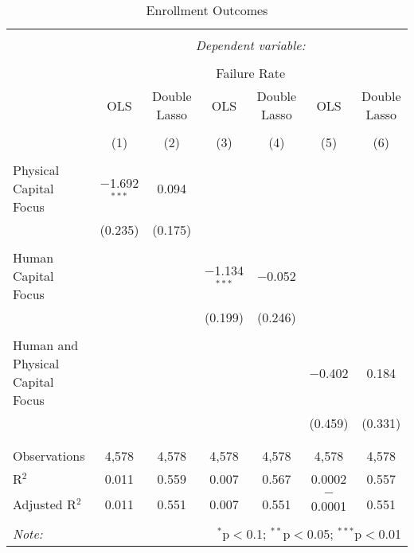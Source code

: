 
\begin{table}[!htbp] \centering 
  \caption{Enrollment Outcomes} 
  \label{} 
\begin{tabular}{@{\extracolsep{5pt}}lcccccc} 
\\[-1.8ex]\hline 
\hline \\[-1.8ex] 
 & \multicolumn{6}{c}{\textit{Dependent variable:}} \\ 
\cline{2-7} 
\\[-1.8ex] & \multicolumn{6}{c}{Failure Rate} \\ 
 & OLS & Double Lasso & OLS & Double Lasso & OLS & Double Lasso \\ 
\\[-1.8ex] & (1) & (2) & (3) & (4) & (5) & (6)\\ 
\hline \\[-1.8ex] 
 Physical Capital Focus & $-$1.692$^{***}$ & 0.094 &  &  &  &  \\ 
  & (0.235) & (0.175) &  &  &  &  \\ 
  & & & & & & \\ 
 Human Capital Focus &  &  & $-$1.134$^{***}$ & $-$0.052 &  &  \\ 
  &  &  & (0.199) & (0.246) &  &  \\ 
  & & & & & & \\ 
 Human and Physical Capital Focus &  &  &  &  & $-$0.402 & 0.184 \\ 
  &  &  &  &  & (0.459) & (0.331) \\ 
  & & & & & & \\ 
\hline \\[-1.8ex] 
Observations & 4,578 & 4,578 & 4,578 & 4,578 & 4,578 & 4,578 \\ 
R$^{2}$ & 0.011 & 0.559 & 0.007 & 0.567 & 0.0002 & 0.557 \\ 
Adjusted R$^{2}$ & 0.011 & 0.551 & 0.007 & 0.551 & $-$0.0001 & 0.551 \\ 
\hline 
\hline \\[-1.8ex] 
\textit{Note:}  & \multicolumn{6}{r}{$^{*}$p$<$0.1; $^{**}$p$<$0.05; $^{***}$p$<$0.01} \\ 
\end{tabular} 
\end{table} 
